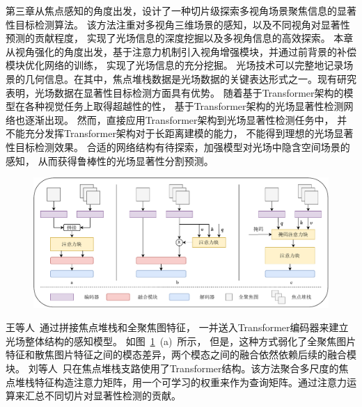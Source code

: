 \label{chap:part4}
%
%
%
%
第三章从焦点感知的角度出发，设计了一种切片级探索多视角场景聚焦信息的显著性目标检测算法。
该方法注重对多视角三维场景的感知，以及不同视角对显著性预测的贡献程度，
实现了光场信息的深度挖掘以及多视角信息的高效探索。
%
%
本章从视角强化的角度出发，基于注意力机制引入视角增强模块，并通过前背景的补偿模块优化网络的训练，
实现了光场信息的充分挖掘。
%
%
%
%
%
%
%
%
光场技术可以完整地记录场景的几何信息。在其中，焦点堆栈数据是光场数据的关键表达形式之一。现有研究表明，光场数据在显著性目标检测方面具有优势\cite{piao2019saliency,zhang2020light,wang2019deep,zhang2019memory,zhang2020lfnet,piao2021panet}。
随着基于Transformer架构的模型在各种视觉任务上取得超越性的性，
基于Transformer架构的光场显著性检测网络也逐渐出现\cite{wang2023tenet,liu2023lftransnet}。
然而，直接应用Transformer架构到光场显著性检测任务中，
并不能充分发挥Transformer架构对于长距离建模的能力，
不能得到理想的光场显著性目标检测效果。
合适的网络结构有待探索，加强模型对光场中隐含空间场景的感知，
从而获得鲁棒性的光场显著性分割预测。
%
%
%
%
\par
%
%
\begin{figure}[!h]
	\centering
	\includegraphics[width=0.95\linewidth]{figures/chapter4/task2_ins.drawio}
	\label{cpt4_fig1:task2_ins}
\end{figure}
%
%
%
%
王等人~\cite{wang2023tenet}通过拼接焦点堆栈和全聚焦图特征，
一并送入Transformer编码器来建立光场整体结构的感知模型。
如图~\ref{cpt4_fig1:task2_ins}~(a)~所示，
但是，这种方式弱化了全聚焦图片特征和散焦图片特征之间的模态差异，两个模态之间的融合依然依赖后续的融合模块。
刘等人~\cite{liu2023lftransnet}只在焦点堆栈支路使用了Transformer结构。该方法聚合多尺度的焦点堆栈特征构造注意力矩阵，用一个可学习的权重来作为查询矩阵。通过注意力运算来汇总不同切片对显著性检测的贡献。
